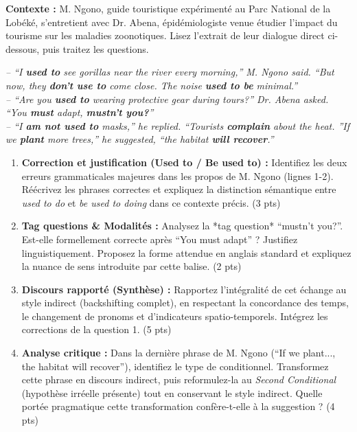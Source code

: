 \documentclass[11pt]{article}
\begin{document}
\begin{exercice}
\textbf{Contexte :} M. Ngono, guide touristique expérimenté au Parc National de la Lobéké, s'entretient avec Dr. Abena, épidémiologiste venue étudier l'impact du tourisme sur les maladies zoonotiques. Lisez l'extrait de leur dialogue direct ci-dessous, puis traitez les questions.

\textit{-- ``I \textbf{used to} see gorillas near the river every morning,'' M. Ngono said. ``But now, they \textbf{don't use to} come close. The noise \textbf{used to be} minimal.''}\\
\textit{-- ``Are you \textbf{used to} wearing protective gear during tours?'' Dr. Abena asked. ``You \textbf{must} adapt, \textbf{mustn't you?}''}\\
\textit{-- ``I \textbf{am not used to} masks,'' he replied. ``Tourists \textbf{complain} about the heat. ''If we \textbf{plant} more trees,'' he suggested, ``the habitat \textbf{will recover}.''}

\begin{enumerate}
    \item \textbf{Correction et justification (Used to / Be used to) :} Identifiez les deux erreurs grammaticales majeures dans les propos de M. Ngono (lignes 1-2). Réécrivez les phrases correctes et expliquez la distinction sémantique entre \textit{used to do} et \textit{be used to doing} dans ce contexte précis. (3 pts)
    \item \textbf{Tag questions \& Modalités :} Analysez la *tag question* ``mustn't you?''. Est-elle formellement correcte après ``You must adapt'' ? Justifiez linguistiquement. Proposez la forme attendue en anglais standard et expliquez la nuance de sens introduite par cette balise. (2 pts)
    \item \textbf{Discours rapporté (Synthèse) :} Rapportez l'intégralité de cet échange au style indirect (backshifting complet), en respectant la concordance des temps, le changement de pronoms et d'indicateurs spatio-temporels. Intégrez les corrections de la question 1. (5 pts)
    \item \textbf{Analyse critique :} Dans la dernière phrase de M. Ngono (``If we plant..., the habitat will recover''), identifiez le type de conditionnel. Transformez cette phrase en discours indirect, puis reformulez-la au \textit{Second Conditional} (hypothèse irréelle présente) tout en conservant le style indirect. Quelle portée pragmatique cette transformation confère-t-elle à la suggestion ? (4 pts)
\end{enumerate}
\end{exercice}
\end{document}
